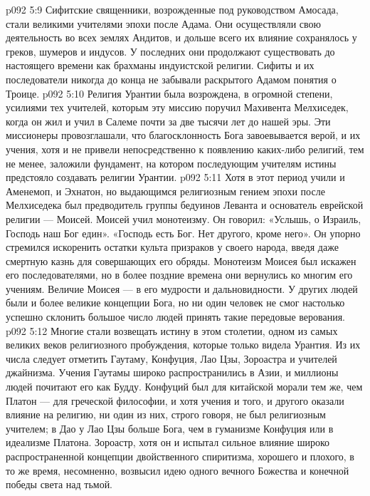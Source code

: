 \vs p092 5:9 \bibnobreakspace {} Сифитские священники, возрожденные под руководством Амосада, стали великими учителями эпохи после Адама. Они осуществляли свою деятельность во всех землях Андитов, и дольше всего их влияние сохранялось у греков, шумеров и индусов. У последних они продолжают существовать до настоящего времени как брахманы индуистской религии. Сифиты и их последователи никогда до конца не забывали раскрытого Адамом понятия о Троице.
\vs p092 5:10 \pc {}\bibnobreakspace {} Религия Урантии была возрождена, в огромной степени, усилиями тех учителей, которым эту миссию поручил Махивента Мелхиседек, когда он жил и учил в Салеме почти за две тысячи лет до нашей эры. Эти миссионеры провозглашали, что благосклонность Бога завоевывается верой, и их учения, хотя и не привели непосредственно к появлению каких\hyp{}либо религий, тем не менее, заложили фундамент, на котором последующим учителям истины предстояло создавать религии Урантии.
\vs p092 5:11 \pc {}\bibnobreakspace {} Хотя в этот период учили и Аменемоп, и Эхнатон, но выдающимся религиозным гением эпохи после Мелхиседека был предводитель группы бедуинов Леванта и основатель еврейской религии --- Моисей. Моисей учил монотеизму. Он говорил: «Услышь, о Израиль, Господь наш Бог един». «Господь есть Бог. Нет другого, кроме него». Он упорно стремился искоренить остатки культа призраков у своего народа, введя даже смертную казнь для совершающих его обряды. Монотеизм Моисея был искажен его последователями, но в более поздние времена они вернулись ко многим его учениям. Величие Моисея --- в его мудрости и дальновидности. У других людей были и более великие концепции Бога, но ни один человек не смог настолько успешно склонить большое число людей принять такие передовые верования.
\vs p092 5:12 \pc {}\bibnobreakspace {} Многие стали возвещать истину в этом столетии, одном из самых великих веков религиозного пробуждения, которые только видела Урантия. Из их числа следует отметить Гаутаму, Конфуция, Лао Цзы, Зороастра и учителей джайнизма. Учения Гаутамы широко распространились в Азии, и миллионы людей почитают его как Будду. Конфуций был для китайской морали тем же, чем Платон --- для греческой философии, и хотя учения и того, и другого оказали влияние на религию, ни один из них, строго говоря, не был религиозным учителем; в Дао у Лао Цзы больше Бога, чем в гуманизме Конфуция или в идеализме Платона. Зороастр, хотя он и испытал сильное влияние широко распространенной концепции двойственного спиритизма, хорошего и плохого, в то же время, несомненно, возвысил идею одного вечного Божества и конечной победы света над тьмой.
